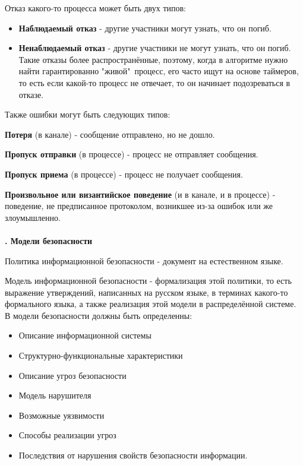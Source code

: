 Отказ какого-то процесса может быть двух типов:
\begin{itemize}
\setlength\itemsep{0.0001em}
\item \textbf{Наблюдаемый отказ}  -  другие участники могут узнать, что он погиб.
\item \textbf{Ненаблюдаемый отказ}  - другие участники не могут узнать, что он погиб. Такие отказы более распространённые, поэтому, когда в алгоритме нужно найти гарантированно "живой"\ процесс, его часто ищут на основе таймеров, то есть если какой-то процесс не отвечает, то он начинает подозреваться в отказе.
\end{itemize}

\noindent Также ошибки могут быть следующих типов:

\textbf{Потеря} (в канале) - сообщение отправлено, но не дошло. 

\textbf{Пропуск отправки} (в процессе) - процесс не отправляет сообщения.

\textbf{Пропуск приема} (в процессе) - процесс не получает сообщения.

\textbf{Произвольное или византийское поведение} (и в канале, и в процессе) - поведение, не предписанное протоколом, возникшее из-за ошибок или же злоумышленно.\\
\\
\textbf{. Модели безопасности}

Политика информационной безопасности - документ на естественном языке.

Модель информационной безопасности - формализация этой политики, то есть выражение утверждений, написанных на русском языке, в терминах какого-то формального языка, а также реализация этой модели в распределённой системе. \\

В модели безопасности должны быть определенны:
\begin{itemize}
\item Описание информационной системы
\item Структурно-функциональные характеристики
\item Описание угроз безопасности
\item Модель нарушителя
\item Возможные уязвимости
\item Способы реализации угроз
\item Последствия от нарушения свойств безопасности информации.
\end{itemize}




